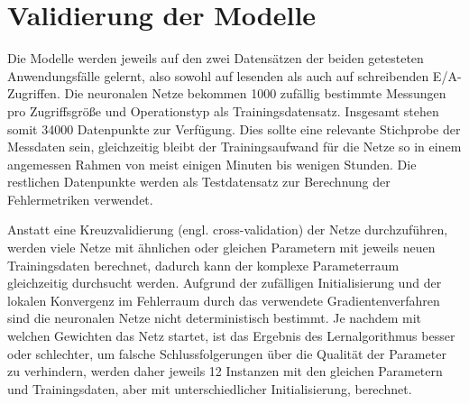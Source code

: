 \documentclass[
	12pt,
	a4paper,
	BCOR10mm,
	DIV14,
	listof=totoc,
	bibliography=totoc,
	headsepline
]{scrreprt}
\begin{document}
\section{Validierung der Modelle}
\label{Validierung}
Die Modelle werden jeweils auf den zwei Datensätzen der beiden getesteten Anwendungsfälle gelernt, also sowohl auf lesenden als auch auf schreibenden E/A-Zugriffen.
Die neuronalen Netze bekommen 1000 zufällig bestimmte Messungen pro Zugriffsgröße und Operationstyp als Trainingsdatensatz. Insgesamt stehen somit 34000 Datenpunkte zur Verfügung.
Dies sollte eine relevante Stichprobe der Messdaten sein, gleichzeitig bleibt der Trainingsaufwand für die Netze so in einem angemessen Rahmen von meist einigen Minuten bis wenigen Stunden.
Die restlichen Datenpunkte werden als Testdatensatz zur Berechnung der Fehlermetriken verwendet.

Anstatt eine Kreuzvalidierung (engl. cross-validation) der Netze durchzuführen, werden viele Netze mit ähnlichen oder gleichen Parametern mit jeweils neuen Trainingsdaten berechnet, dadurch kann der komplexe Parameterraum gleichzeitig durchsucht werden.
Aufgrund der zufälligen Initialisierung und der lokalen Konvergenz im Fehlerraum durch das verwendete Gradientenverfahren sind die neuronalen Netze nicht deterministisch bestimmt.
Je nachdem mit welchen Gewichten das Netz startet, ist das Ergebnis des Lernalgorithmus besser oder schlechter, um falsche Schlussfolgerungen über die Qualität der Parameter zu verhindern, werden daher jeweils 12 Instanzen mit den gleichen Parametern und Trainingsdaten, aber mit unterschiedlicher Initialisierung, berechnet.
\end{document}
